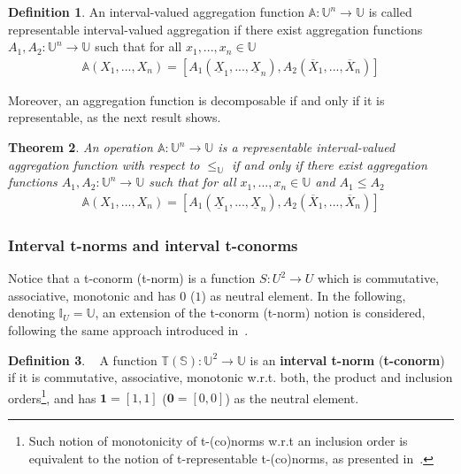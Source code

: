 \documentclass[conference]{IEEEtran}
\theoremstyle{plain}
\newtheorem{theorem}{Theorem}[section]
\theoremstyle{remark}
\theoremstyle{definition}
\newtheorem{definition}[theorem]{Definition}
\theoremstyle{proposition}
\newcommand{\II}{\mathbb{I} }
\newcommand{\UU}{\mathbb{U} }
\begin{document}
\begin{definition}\label{def-intAgRepresentable}
An interval-valued aggregation function $\mathbb{A} : \UU^n \rightarrow \UU$ is called representable interval-valued aggregation if there exist aggregation functions $A_1, A_2 : \UU^n \rightarrow \UU$ such that for all $x_1,...,x_n \in \UU$
\begin{eqnarray}
\mathbb{A}(X_1,...,X_n) = [A_1(\underline{X}_1,..., \underline{X}_n), A_2(\overline{X}_1,..., \overline{X}_n)]
\end{eqnarray}
\end{definition}

Moreover, an aggregation function is decomposable if and only if it is representable, as the next result shows.

\begin{theorem}\label{teo-S-imp-BIR}
An operation $\mathbb{A} : \UU^n \rightarrow \UU$ is a representable interval-valued aggregation function with respect to $\leq_\UU$ if and only if there exist aggregation functions $A_1, A_2 : \UU^n \rightarrow \UU$ such that for all $x_1,...,x_n \in \UU$ and $A_1 \leq A_2$
\begin{eqnarray}
\mathbb{A}(X_1,...,X_n) = [A_1(\underline{X}_1,..., \underline{X}_n), A_2(\overline{X}_1,..., \overline{X}_n)]
\end{eqnarray}
\end{theorem}

\subsubsection{Interval t-norms and interval t-conorms}\label{subsec-3b} 
Notice that  a t-conorm (t-norm) is a function $S:U^2 \rightarrow U$ which is commutative,  associative, monotonic and has $0$ ($1$) as neutral element. In the following, denoting $\II_{U}=\mathbb{U}$, an extension of the t-conorm (t-norm) notion is considered, following the same approach introduced in~\cite{BT06b}.

\begin{definition}~\cite[Definition 5.1]{BT06b} \label{def-itnorm}
A function  $\mathbb{T}(\mathbb{S}):\UU^2 \rightarrow \UU$ is an \textbf{interval t-norm}  (\textbf{t-conorm}) if it is commutative, associative, monotonic w.r.t. both, the product and inclusion orders\footnote{Such notion of monotonicity of t-(co)norms w.r.t an inclusion order is equivalent to the notion of t-representable t-(co)norms, as presented in~\cite{Des08}.}, and has $\mathbf{1}=[1,1]$ ($\mathbf{0}=[0,0]$) as the neutral element.
\end{definition}
\end{document}
